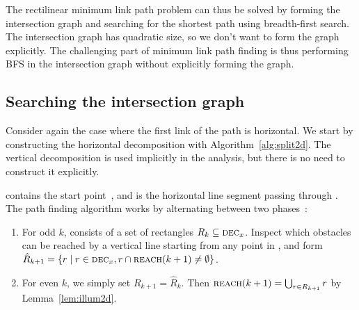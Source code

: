 \documentclass[english,gradu]{tktltiki2018}
\begin{document}
The rectilinear minimum link path problem can thus be solved by forming the intersection graph and searching for the shortest path using breadth-first search.
The intersection graph has quadratic size, so we don't want to form the graph explicitly.
The challenging part of minimum link path finding is thus performing BFS in the intersection graph without explicitly forming the graph.

\subsection{Searching the intersection graph}

Consider again the case where the first link of the path is horizontal.
We start by constructing the horizontal decomposition with Algorithm~\ref{alg:split2d}.
The vertical decomposition is used implicitly in the analysis, but there is no need to construct it explicitly.

 contains the start point~\spt, and  is the horizontal line segment passing through \spt.
The path finding algorithm works by alternating between two phases~\cite{revisited}:

\begin{enumerate}
\item For odd $k$,  consists of a set of rectangles $R_k\subseteq\textsc{dec}_{x}$.
	Inspect which obstacles can be reached by a vertical line starting from any point in , and form $\hat{R}_{k+1}=\left\{r \mid r\in\textsc{dec}_{x}, r\cap\textsc{reach}(k+1)\neq\emptyset\right\}$.
\item For even $k$, we simply set $R_{k+1}=\hat{R}_k$.
	Then $\textsc{reach}(k+1)=\bigcup_{r\in R_{k+1}}r$ by Lemma~\ref{lem:illum2d}.
\end{enumerate}
\end{document}
